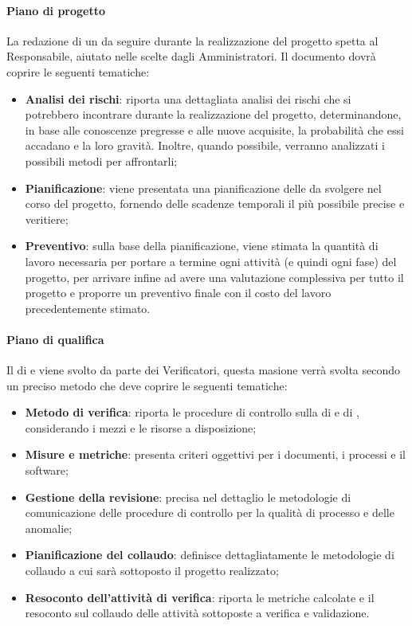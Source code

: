 \paragraph{Piano di progetto}\Spazio
La redazione di un  da seguire durante la realizzazione del progetto spetta al Responsabile, aiutato nelle scelte dagli Amministratori. Il documento dovrà coprire le seguenti tematiche:
 \begin{itemize}
 	\item\textbf{{Analisi dei rischi}}: riporta una dettagliata analisi dei rischi che si potrebbero incontrare durante la realizzazione del progetto, determinandone, in base alle conoscenze pregresse e alle nuove acquisite, la probabilità che essi accadano e la loro gravità. Inoltre, quando possibile, verranno analizzati i possibili metodi per affrontarli;
 	\item\textbf{{Pianificazione}}: viene presentata una pianificazione delle  da svolgere nel corso del progetto, fornendo delle scadenze temporali il più possibile precise e veritiere;
 	\item\textbf{{Preventivo}}: sulla base della pianificazione, viene stimata la quantità di lavoro necessaria per portare a termine ogni attività (e quindi ogni fase) del progetto, per arrivare infine ad avere una valutazione complessiva per tutto il progetto e proporre un preventivo finale con il costo del lavoro precedentemente stimato.
 \end{itemize}
\paragraph{Piano di qualifica}\Spazio
Il  di  e  viene svolto da parte dei Verificatori, questa masione verrà svolta secondo un preciso metodo che deve coprire le seguenti tematiche:
\begin{itemize}
	\item\textbf{{Metodo di verifica}}: riporta le procedure di controllo sulla  di  e di , considerando i mezzi e le risorse a disposizione;
	\item\textbf{{Misure e metriche}}: presenta criteri oggettivi per i documenti, i processi e il software;
	\item\textbf{{Gestione della revisione}}: precisa nel dettaglio le metodologie di comunicazione delle procedure di controllo per la qualità di processo e delle anomalie;
	\item\textbf{{Pianificazione del collaudo}}: definisce dettagliatamente le metodologie di collaudo a cui sarà sottoposto il progetto realizzato;
	\item\textbf{{Resoconto dell'attività di verifica}}: riporta le metriche calcolate e il resoconto sul collaudo delle attività sottoposte a verifica e validazione.
\end{itemize}
